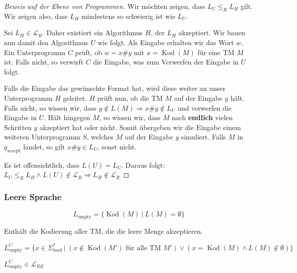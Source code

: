 \begin{proof}[Beweis auf der Ebene von Programmen]
Wir möchten zeigen, dass \( L_U \leq_R L_H \) gilt. Wir zeigen also, dass \( L_H \) mindestens so schwierig ist wie \( L_U \).

Sei \( L_H \in \mathcal{L}_R \). Daher existiert ein Algorithmus \( H \), der \( L_H \) akzeptiert. Wir bauen nun damit den Algorithmus \( U \) wie folgt. Als Eingabe erhalten wir das Wort \( w \). Ein Unterprogramm \( C \) prüft, ob \(w = x \# y \) mit \( x = \operatorname{Kod}(M) \) für eine TM \( M \) ist. Falls nicht, so verwirft \( C \) die Eingabe, was zum Verwerfen der Eingabe in \( U \) folgt.

Falls die Eingabe das gewünschte Format hat, wird diese weiter an unser Unterprogramm \( H \) geleitet. \( H \) prüft nun, ob die TM \(M\) auf der Eingabe \( y \) hält. Falls nicht, so wissen wir, dass \( y \notin L(M) \Rightarrow x \# y \notin L_U \) und verwerfen die Eingabe in \( U \). Hält hingegen \( M \), so wissen wir, dass \( M \) nach \textbf{endlich} vielen Schritten \( y \) akzeptiert hat oder nicht. Somit übergeben wir die Eingabe einem weiteren Unterprogramm \( S \), welches \( M \) auf der Eingabe \( y \) simuliert. Falls \( M \) in  \( q_\text{accept} \) landet, so gilt \( x \# y \in L_U \), sonst nicht.

Es ist offensichtlich, dass \( L(U) = L_U \). Daraus folgt: \( L_U \leq_R L_H \land L(U) \notin \mathcal{L}_R \Rightarrow L_H \notin \mathcal{L}_R \)

\end{proof}

\subsubsection{Leere Sprache}
\begin{definition}
\[
L_\text{empty} = \{ \operatorname{Kod}(M) \ |\ L(M) = \emptyset \}
\]

Enthält die Kodierung aller TM, die die leere Menge akzeptieren.\\
\end{definition}

\begin{corollary}
\[
L_\text{empty}^C = \{ x \in \Sigma_\text{bool}^* \ |\ (x \notin \operatorname{Kod}(M') \text{ für alle TM } M') \lor (x = \operatorname{Kod}(M) \land L(M) \notin \emptyset) \}
\]
\end{corollary}

\begin{lemma}
\( L_\text{empty}^C \in \mathcal{L}_{RE} \)
\end{lemma}

